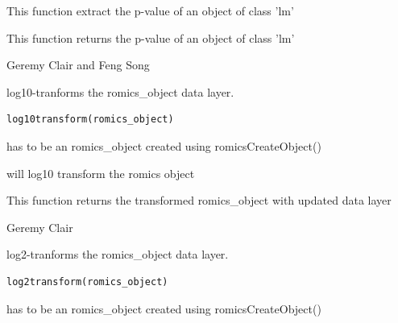 \documentclass[a4paper]{book}
\begin{document}
%
\begin{Details}
This function extract the p-value of an object of class 'lm'
\end{Details}
%
\begin{Value}
This function returns the p-value of an object of class 'lm'
\end{Value}
%
\begin{Author}
Geremy Clair and Feng Song
\end{Author}
%
\begin{Description}
log10-tranforms the romics\_object data layer.
\end{Description}
%
\begin{Usage}
\begin{verbatim}
log10transform(romics_object)
\end{verbatim}
\end{Usage}
%
\begin{Arguments}
\begin{ldescription}
\item[\code{romics\_object}] has to be an romics\_object created using romicsCreateObject()
\end{ldescription}
\end{Arguments}
%
\begin{Details}
will log10 transform the romics object
\end{Details}
%
\begin{Value}
This function returns the transformed romics\_object with updated data layer
\end{Value}
%
\begin{Author}
Geremy Clair
\end{Author}
%
\begin{Description}
log2-tranforms the romics\_object data layer.
\end{Description}
%
\begin{Usage}
\begin{verbatim}
log2transform(romics_object)
\end{verbatim}
\end{Usage}
%
\begin{Arguments}
\begin{ldescription}
\item[\code{romics\_object}] has to be an romics\_object created using romicsCreateObject()
\end{ldescription}
\end{Arguments}
\end{document}
